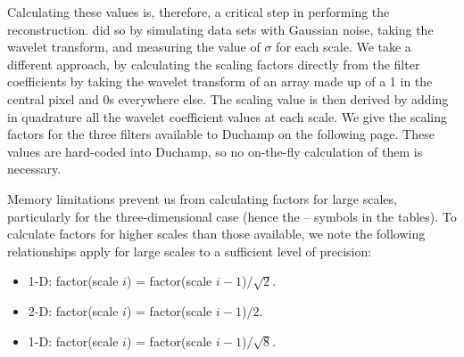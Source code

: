 \documentclass[12pt,a4paper]{article}
\begin{document}
Calculating these values is, therefore, a critical step in performing
the reconstruction. \citet{starck02:book} did so by simulating data sets
with Gaussian noise, taking the wavelet transform, and measuring the
value of $\sigma$ for each scale. We take a different approach, by
calculating the scaling factors directly from the filter coefficients
by taking the wavelet transform of an array made up of a 1 in the
central pixel and 0s everywhere else. The scaling value is then
derived by adding in quadrature all the wavelet coefficient values at
each scale. We give the scaling factors for the three filters
available to Duchamp on the following page. These values are
hard-coded into Duchamp, so no on-the-fly calculation of them is
necessary. 

Memory limitations prevent us from calculating factors for large
scales, particularly for the three-dimensional case (hence the --
symbols in the tables). To calculate factors for
higher scales than those available, we note the following
relationships apply for large scales to a sufficient level of precision:
\begin{itemize}
\item 1-D: factor(scale $i$) = factor(scale $i-1$)$/\sqrt{2}$.
\item 2-D: factor(scale $i$) = factor(scale $i-1$)$/2$.
\item 1-D: factor(scale $i$) = factor(scale $i-1$)$/\sqrt{8}$.
\end{itemize}
\end{document}
